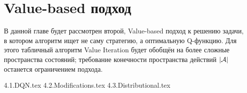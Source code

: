 \chapter{Value-based подход}\label{valuebasedchapter}

В данной главе будет рассмотрен второй, Value-based подход к решению задачи, в котором алгоритм ищет не саму стратегию, а оптимальную Q-функцию. Для этого табличный алгоритм Value Iteration будет обобщён на более сложные пространства состояний; требование конечности пространства действий $|\mathcal{A}|$ останется ограничением подхода.

{4.1.DQN.tex}
{4.2.Modifications.tex}
{4.3.Distributional.tex}